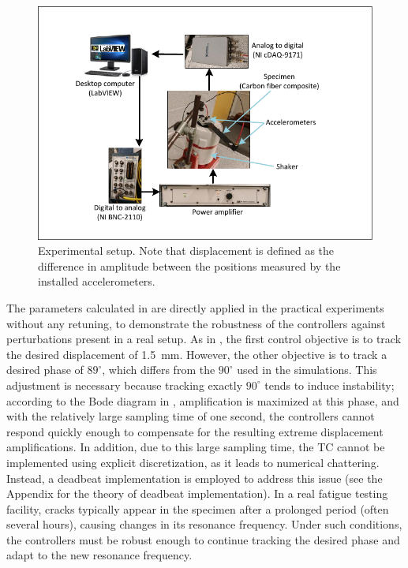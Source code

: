 \documentclass[preprint,12pt]{elsarticle}
\begin{document}
\begin{figure}
    \centering    \includegraphics[width=\linewidth]{F_experiments.pdf}
    \caption{Experimental setup. Note that displacement is defined as the difference in amplitude between the positions measured by the installed accelerometers.
    }
    \label{F_setup}
\end{figure}

The parameters calculated in  are directly applied in the practical experiments without any retuning, to demonstrate the robustness of the controllers against perturbations present in a real setup. As in , the first control objective is to track the desired displacement of 1.5~mm. However, the other objective is to track a desired phase of $89^\circ$, which differs from the $90^\circ$ used in the simulations. This adjustment is necessary because tracking exactly $90^\circ$ tends to induce instability; according to the Bode diagram in , amplification is maximized at this phase, and with the relatively large sampling time of one second, the controllers cannot respond quickly enough to compensate for the resulting extreme displacement amplifications. In addition, due to this large sampling time, the TC cannot be implemented using explicit discretization, as it leads to numerical chattering. Instead, a deadbeat implementation is employed to address this issue (see the Appendix for the theory of deadbeat implementation). In a real fatigue testing facility, cracks typically appear in the specimen after a prolonged period (often several hours), causing changes in its resonance frequency. Under such conditions, the controllers must be robust enough to continue tracking the desired phase and adapt to the new resonance frequency.
\end{document}
